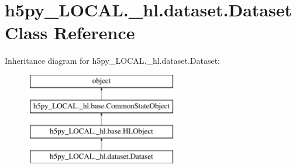 \hypertarget{classh5py__LOCAL_1_1__hl_1_1dataset_1_1Dataset}{}\section{h5py\+\_\+\+L\+O\+C\+A\+L.\+\_\+hl.\+dataset.\+Dataset Class Reference}
\label{classh5py__LOCAL_1_1__hl_1_1dataset_1_1Dataset}
Inheritance diagram for h5py\+\_\+\+L\+O\+C\+A\+L.\+\_\+hl.\+dataset.\+Dataset\+:\begin{figure}[H]
\begin{center}
\leavevmode
\includegraphics[height=4.000000cm]{classh5py__LOCAL_1_1__hl_1_1dataset_1_1Dataset}
\end{center}
\end{figure}
